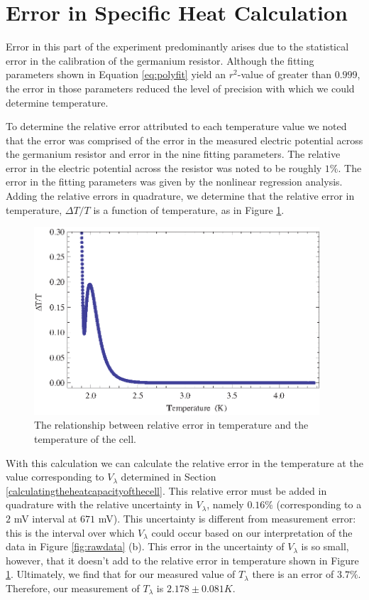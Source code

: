 
\section{Error in Specific Heat Calculation}\label{errorinspecificheatcalculation}

Error in this part of the experiment predominantly arises due to the statistical error in the calibration of the germanium resistor.  Although the fitting parameters shown in Equation \ref{eq:polyfit} yield an $r^{2}$-value of greater than $0.999$, the error in those parameters reduced the level of precision with which we could determine temperature.  

To determine the relative error attributed to each temperature value we noted that the error was comprised of the error in the measured electric potential across the germanium resistor and error in the nine fitting parameters.  The relative error in the electric potential across the resistor was noted to be roughly $1\%$.  The error in the fitting parameters was given by the nonlinear regression analysis.  Adding the relative errors in quadrature, we determine that the relative error in temperature, $\Delta T/T$ is a function of temperature, as in Figure \ref{fig:temperror}.  

\begin{figure}[htbp]
\begin{center}
\includegraphics[height=70mm]{./figures/temperror.eps}
\caption{\small{The relationship between relative error in temperature and the temperature of the cell.}}
\label{fig:temperror}
\end{center}
\end{figure}

With this calculation we can calculate the relative error in the temperature at the value corresponding to $V_{\lambda}$ determined in Section \ref{calculatingtheheatcapacityofthecell}.  This relative error must be added in quadrature with the relative uncertainty in $V_{\lambda}$, namely $0.16\%$ (corresponding to a $2$ mV interval at $671$ mV).  This uncertainty is different from measurement error: this is the interval over which $V_{\lambda}$ could occur based on our interpretation of the data in Figure \ref{fig:rawdata} (b).  This error in the uncertainty of $V_{\lambda}$ is so small, however, that it doesn't add to the relative error in temperature shown in Figure \ref{fig:temperror}.  Ultimately, we find that for our measured value of $T_{\lambda}$ there is an error of $3.7\%$.  Therefore, our measurement of $T_{\lambda}$ is $2.178\pm0.081 K$.


